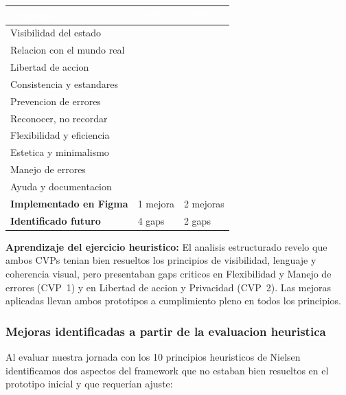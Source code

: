 \documentclass[12pt,a4paper]{article}
\newcommand{\hbien}{\textcolor{okgreen}{\CIRCLE}}
\newcommand{\hmed}{\textcolor{warnorange}{\LEFTcircle}}
\newcommand{\hmal}{\textcolor{accentcoral}{\Circle}}
\begin{document}
{\small
\begin{center}
\begin{tabular}{L{4.8cm}C{2cm}C{2cm}}
\toprule
{}
\textcolor{white}{\textbf{Principio}} &
\textcolor{white}{\textbf{CVP~1}} &
\textcolor{white}{\textbf{CVP~2}} \\
\midrule
Visibilidad del estado     & \hbien & \hbien \\
Relacion con el mundo real & \hbien & \hbien \\
Libertad de accion         & \hmed  & \hmal  \\
Consistencia y estandares  & \hbien & \hbien \\
Prevencion de errores      & \hmed  & \hbien \\
Reconocer, no recordar     & \hbien & \hbien \\
Flexibilidad y eficiencia  & \hmed  & \hmed  \\
Estetica y minimalismo     & \hbien & \hbien \\
Manejo de errores          & \hmal  & \hbien \\
Ayuda y documentacion      & \hmed  & \hmal  \\
\midrule
\textbf{Implementado en Figma} & 1 mejora & 2 mejoras \\
\textbf{Identificado futuro}   & 4 gaps   & 2 gaps   \\
\bottomrule
\end{tabular}
\end{center}
}

\begin{insight}
\textbf{Aprendizaje del ejercicio heuristico:} El analisis estructurado revelo
que ambos CVPs tenian bien resueltos los principios de visibilidad, lenguaje
y coherencia visual, pero presentaban gaps criticos en Flexibilidad y Manejo
de errores (CVP~1) y en Libertad de accion y Privacidad (CVP~2). Las mejoras
aplicadas llevan ambos prototipos a cumplimiento pleno en todos los principios.
\end{insight}

\subsubsection{Mejoras identificadas a partir de la evaluacion heuristica}

Al evaluar nuestra jornada con los 10 principios heuristicos de Nielsen
identificamos dos aspectos del framework que no estaban bien resueltos en
el prototipo inicial y que requerían ajuste:
\end{document}
